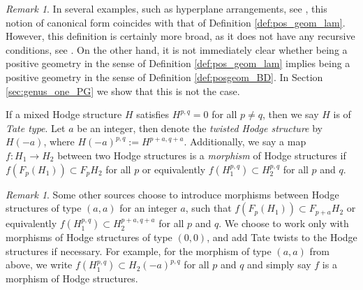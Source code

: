 \documentclass[12pt]{extarticle}
\theoremstyle{definition}
\theoremstyle{theorem}
\theoremstyle{remark}
\newtheorem{remark}[definition]{Remark}
\numberwithin{equation}{section}
\begin{document}
\begin{remark}
    In several examples, such as hyperplane arrangements, see \cite[Section 6]{brown-dupont}, this notion of canonical form coincides with that of Definition \ref{def:pos_geom_lam}.
    However, this definition is certainly more broad, as it does not have any recursive conditions, see \cite[Remark 2.4.3]{brown-dupont}.
    On the other hand, it is not immediately clear whether being a positive geometry in the sense of Definition \ref{def:pos_geom_lam} implies being a positive geometry in the sense of Definition \ref{def:posgeom_BD}.
    In Section \ref{sec:genus_one_PG} we show that this is not the case.
\end{remark}
    If a mixed Hodge structure $H$ satisfies $H^{p,q}=0$ for all $p\neq q$, then we say $H$ is of \emph{Tate type}.
    Let $a$ be an integer, then denote the \emph{twisted Hodge structure} by $H(-a)$, where $H(-a)^{p,q}:=H^{p+a,q+a}$.
    Additionally, we say a map $f:H_1\rightarrow H_2$ between two Hodge structures is a \emph{morphism} of Hodge structures if $f(F_p(H_1))\subset F_{p}H_2$ for all $p$ or equivalently $f(H_1^{p,q})\subset H_2^{p,q}$ for all $p$ and $q$.
\begin{remark}
    Some other sources choose to introduce morphisms between Hodge structures of type $(a,a)$ for an integer $a$, such that $f(F_p(H_1))\subset F_{p+a}H_2$ or equivalently $f(H_1^{p,q})\subset H_2^{p+a,q+a}$ for all $p$ and $q$.
    We choose to work only with morphisms of Hodge structures of type $(0,0)$, and add Tate twists to the Hodge structures if necessary. 
    For example, for the morphism of type $(a,a)$ from above, we write $f(H_1^{p,q})\subset H_2(-a)^{p,q}$ for all $p$ and $q$ and simply say $f$ is a morphism of Hodge structures.
\end{remark}
\end{document}
